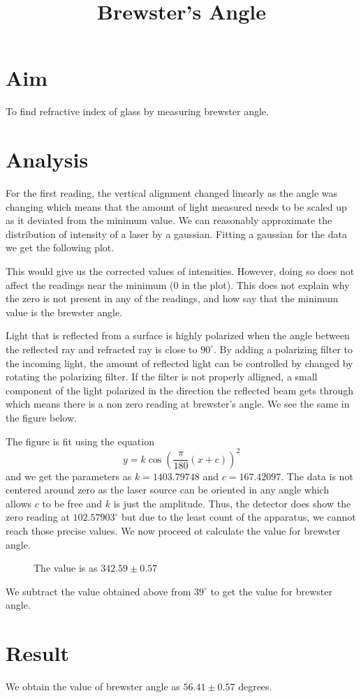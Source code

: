\documentclass[12pt]{article}
\newlength\fwidth
\newlength\fheight
\begin{document}
\author{}
\date{}
\title{Brewster's Angle}
\maketitle
\section*{Aim}
To find refractive index of glass by measuring brewster angle.
\section*{Analysis}
For the first reading, the vertical alignment changed linearly as the angle was changing which means that the amount of light measured needs to be scaled up as it deviated from the minimum value.
We can reasonably approximate the distribution of intensity of a laser by a gaussian.
Fitting a gaussian for the data we get the following plot.
\begin{figure}[H]
    \centering
    \setlength{}
    \setlength{}
    
\end{figure}
This would give us the corrected values of intensities.
However, doing so does not affect the readings near the minimum (\(0\) in the plot).
This does not explain why the zero is not present in any of the readings, and how say that the minimum value is the brewster angle.

Light that is reflected from a surface is highly polarized when the angle between the reflected ray and refracted ray is close to \(90^\circ\).
By adding a polarizing filter to the incoming light, the amount of reflected light can be controlled by changed by rotating the polarizing filter.
If the filter is not properly alligned, a small component of the light polarized in the direction the reflected beam gets through which means there is a non zero reading at brewster's angle.
We see the same in the figure below.
\begin{figure}[H]
    \centering
    \setlength{}
    \setlength{}
    
\end{figure}
The figure is fit using the equation
\[y =  k\cos\left(\frac{\pi}{180}(x+c)\right)^{2}\]
and we get the parameters as \(k=1403.79748\) and \(c=167.42097\).
The data is not centered around zero as the laser source can be oriented in any angle which allows $c$ to be free and $k$ is just the amplitude.
Thus, the detector does show the zero reading at $102.57903^\circ$ but due to the least count of the apparatus, we cannot reach those precise values.
We now proceed ot calculate the value for brewster angle.
\begin{figure}[H]
    \centering
    \setlength{}
    \setlength{}
    
    \caption{The value is as $ 342.59 \pm 0.57$ }
\end{figure}
We subtract the value obtained above from $39^\circ$ to get the value for brewster angle.
\section*{Result}
We obtain the value of brewster angle as $ 56.41 \pm 0.57$ degrees.
\end{document}
